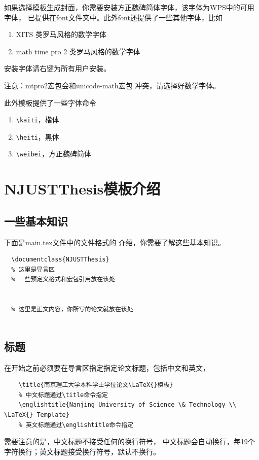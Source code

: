 如果选择模板生成封面，你需要安装{\ttfamily 方正魏碑简体}字体，该字体为WPS中的可用字体，
已提供在{\ttfamily font}文件夹中。此外{\ttfamily font}还提供了一些其他字体，比如
\begin{enumerate}
    \item {\ttfamily XITS} 类罗马风格的数学字体
    \item {\ttfamily math time pro 2} 类罗马风格的数学字体
\end{enumerate}
安装字体请右键为所有用户安装。

{\color{red} \heiti 注意：{\ttfamily mtpro2}宏包会和{\ttfamily unicode-math}宏包
冲突，请选择好数学字体}。

此外模板提供了一些字体命令
\begin{enumerate}
    \item \lstinline|\kaiti|，{\kaiti 楷体}
    \item \lstinline|\heiti|，{\heiti 黑体}
    \item \lstinline|\weibei|，{\weibei 方正魏碑简体}
\end{enumerate}

\section{NJUSTThesis模板介绍}
\subsection{一些基本知识}
下面是{\ttfamily main.tex}文件中的文件格式的
介绍，你需要了解这些基本知识。
\begin{lstlisting}
  \documentclass{NJUSTThesis}
  % 这里是导言区
  % 一些预定义格式和宏包引用放在该处

  
  % 这里是正文内容，你所写的论文就放在该处
  
\end{lstlisting}
\subsection{标题}
在开始之前必须要在导言区指定指定论文标题，包括中文和英文，
\begin{lstlisting}
    \title{南京理工大学本科学士学位论文\LaTeX{}模板}
    % 中文标题通过\title命令指定
    \englishtitle{Nanjing University of Science \& Technology \\ \LaTeX{} Template}
    % 英文标题通过\englishtitle命令指定
\end{lstlisting}
需要注意的是，中文标题不接受任何的换行符号，
中文标题会自动换行，每19个字符换行；英文标题接受换行符号，默认不换行。

